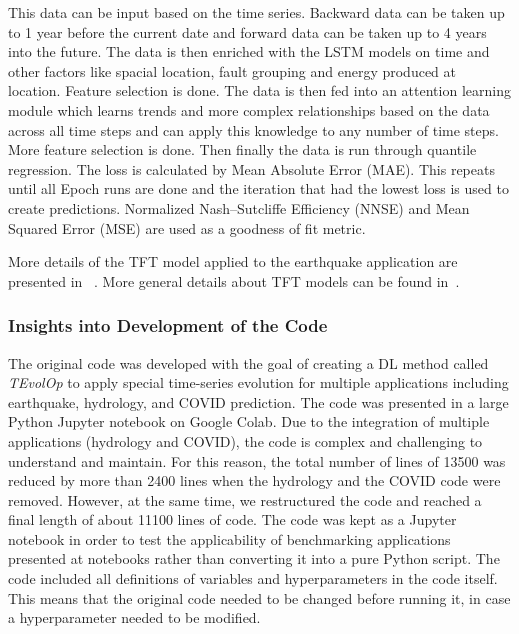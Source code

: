 This data can be input based on the time series. Backward data can be taken up to 1 year before the current date and forward data can be taken up to 4 years into the future. The data is then enriched with the LSTM models on time and other factors like spacial location, fault grouping and energy produced at location. Feature selection is done. The data is then fed into an attention learning module which learns trends and more complex relationships based on the data across all time steps and can apply this knowledge to any number of time steps. More feature selection is done. Then finally the data is run through quantile regression. The loss is calculated by Mean Absolute Error (MAE). This repeats until all Epoch runs are done and the iteration that had the lowest loss is used to create predictions. Normalized Nash–Sutcliffe Efficiency (NNSE) and Mean Squared Error (MSE) are used as a goodness of fit metric.

More details of the TFT model applied to the earthquake application are presented in ~\citep{fox2022-jm}. More general details about TFT models can be found in~\citep{TFT-21}.



\subsubsection{Insights into Development of the Code}

The original code was developed with the goal of creating a DL method called {\em TEvolOp} to apply special time-series evolution for multiple applications including earthquake, hydrology, and COVID prediction. The code was presented in a large Python Jupyter notebook on Google Colab.  Due to the integration of multiple applications (hydrology and COVID), the code is complex and challenging to understand and maintain. For this reason, the total number of lines of 13500 was reduced by more than 2400 lines when the hydrology and the COVID code were removed. However, at the same time, we restructured the code and reached a final length of about 11100 lines of code. The code was kept as a Jupyter notebook in order to test the applicability of benchmarking applications presented at notebooks rather than converting it into a pure Python script. The code included all definitions of variables and hyperparameters in the code itself. This means that the original code needed to be changed before running it, in case a hyperparameter needed to be modified.  


